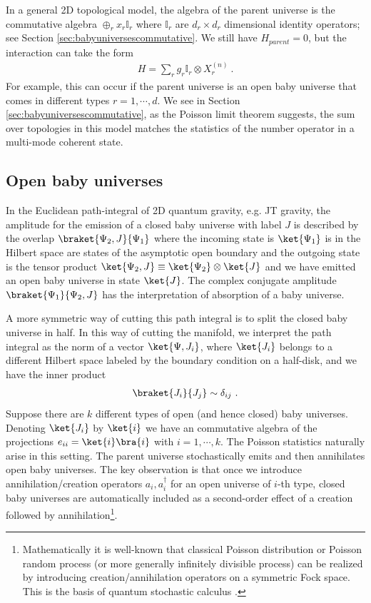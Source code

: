 \documentclass[a4paper,11pt]{article}
\theoremstyle{definition}
\numberwithin{equation}{section}
\begin{document}
In a general 2D topological model, the algebra of the parent universe is the commutative algebra $\oplus_r x_r \mathbb{I}_r$ where $\mathbb{I}_r$ are $d_r\times d_r$ dimensional identity operators; see Section \ref{sec:babyuniversescommutative}. We still have $H_{parent}=0$, but the interaction can take the form
\begin{eqnarray}
    H=\sum_r g_r \mathbb{I}_r\otimes X_r^{(n)}\ . 
\end{eqnarray}
For example, this can occur if the parent universe is an open baby universe that comes in different types $r=1,\cdots, d$. We see in Section \ref{sec:babyuniversescommutative}, as the Poisson limit theorem suggests, the sum over topologies in this model matches the statistics of the number operator in a multi-mode coherent state.



\subsection{Open baby universes}\label{subsec:openbaby}

In the Euclidean path-integral of 2D quantum gravity, e.g. JT gravity, the amplitude for the emission of a closed baby universe with label $J$ is described by the overlap $\braket{\Psi_2,J}{\Psi_1}$ where the incoming state is $\ket{\Psi_1}$ is in the  Hilbert space are states of the asymptotic open boundary and the outgoing state is the tensor product $\ket{\Psi_2,J}\equiv\ket{\Psi_2}\otimes \ket{J}$ and we have emitted an open baby universe in state $\ket{J}$. The complex conjugate amplitude $\braket{\Psi_1}{\Psi_2,J}$ has the interpretation of absorption of a baby universe.

A more symmetric way of cutting this path integral is to split the closed baby universe in half. In this way of cutting the manifold, we interpret the path integral as the norm of a vector $\ket{\Psi,J_i}$, where $\ket{J_i}$ belongs to a different Hilbert space labeled by the boundary condition on a half-disk, and we have the inner product
\begin{eqnarray}
    \braket{J_i}{J_j}\sim\delta_{ij}\ .
\end{eqnarray}
Suppose there are $k$ different types of open (and hence closed) baby universes. Denoting $\ket{J_i}$ by $\ket{i}$ we have an commutative algebra of the projections $e_{ii}=\ket{i}\bra{i}$ with $i=1,\cdots, k$. The Poisson statistics naturally arise in this setting. The parent universe stochastically emits and then annihilates open baby universes. The key observation is that once we introduce annihilation/creation operators $a_i, a_i^\dagger$ for an open universe of $i$-th type, closed baby universes are automatically included as a second-order effect of a creation followed by annihilation\footnote{Mathematically it is well-known that classical Poisson distribution or Poisson random process (or more generally infinitely divisible process) can be realized by introducing creation/annihilation operators on a symmetric Fock space. This is the basis of quantum stochastic calculus \cite{quantStoch}.}.
\end{document}
